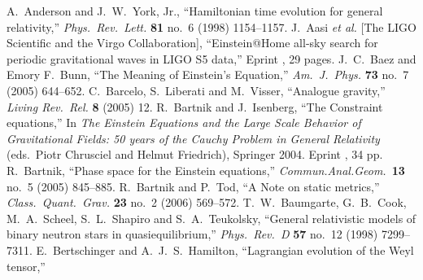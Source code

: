 %
%
\renewcommand\refname{Articles}
\begin{thebibliography}{99}\addcontentsline{toc}{subsection}{\refname}
  A.~Anderson and J.~W.~York, Jr.,
  ``Hamiltonian time evolution for general relativity,''\newblock
  \emph{Phys.\ Rev.\ Lett.} {\bf 81} no.~6 (1998) 1154--1157\newblock
  [\arXiv{gr-qc/9807041}].
  J.~Aasi {\it et al.}  [The LIGO Scientific and the Virgo Collaboration],\newblock
  ``Einstein@Home all-sky search for periodic gravitational waves in LIGO S5 data,''\newblock
  Eprint , 29 pages.\newblock
  J.~C.~Baez and Emory F.~Bunn,\newblock
  ``The Meaning of Einstein's Equation,''\newblock
  \emph{Am.\ J.\ Phys.}  {\bf 73} no.~7 (2005) 644--652\newblock
  [\arXiv{gr-qc/0103044}].
  C.~Barcelo, S.~Liberati and M.~Visser,\newblock
  ``Analogue gravity,''\newblock
  \emph{Living Rev.\ Rel.} {\bf 8} (2005) 12\newblock
  [\arXiv{gr-qc/0505065}].
  R.~Bartnik and J.~Isenberg,\newblock
  ``The Constraint equations,''\newblock
  In \emph{The Einstein Equations and the Large Scale Behavior of Gravitational Fields: 50 years of the Cauchy Problem in General Relativity} (eds.\ Piotr
  Chrusciel and Helmut Friedrich), Springer 2004.\newblock
  Eprint , 34 pp.
  R.~Bartnik,\newblock
  ``Phase space for the Einstein equations,''\newblock
  \emph{Commun.Anal.Geom.}~{\bf13} no.~5 (2005) 845--885\newblock
  [\arXiv{gr-qc/0402070}].
  R.~Bartnik and P.~Tod,
  ``A Note on static metrics,''\newblock
  \emph{Class.\ Quant.\ Grav.} {\bf 23} no.~2 (2006) 569--572\newblock
  [\arXiv{gr-qc/0512097}].
  T.~W.~Baumgarte, G.~B.~Cook, M.~A.~Scheel, S.~L.~Shapiro and S.~A.~Teukolsky,\newblock
  ``General relativistic models of binary neutron stars in quasiequilibrium,''\newblock
  \emph{Phys.\ Rev.\ D} {\bf 57} no.~12 (1998) 7299--7311\newblock
  [\arXiv{gr-qc/9709026}].
  E.~Bertschinger and A.~J.~S.~Hamilton,\newblock
  ``Lagrangian evolution of the Weyl tensor,''\newblock

\end{thebibliography}
